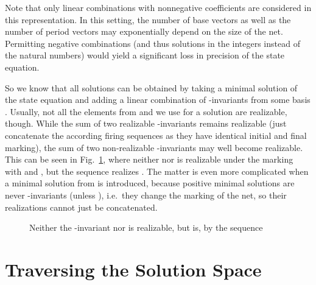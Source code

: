 \documentclass{LMCS}
\begin{document}
Note that only linear combinations with nonnegative coefficients are considered in this representation.
In this setting, the number of base vectors as well as the number of period vectors may exponentially depend on the
size of the net. Permitting negative combinations (and thus solutions in the integers instead of the natural numbers)
would yield a significant loss in precision of the state equation.


So we know that all solutions can be obtained by taking a minimal solution  of the state equation
and adding a linear combination of -invariants from some basis . Usually, not all the elements
from  and  we use for a solution are realizable, though. While the sum of two realizable -invariants
remains realizable (just concatenate the according firing sequences as they have identical initial and final marking), 
the sum of two non-realizable
-invariants may well become realizable. This can be seen in Fig.~\ref{f.tinv2}, where neither 
nor  is realizable under the marking  with  and , 
but the sequence  realizes . The matter is even more complicated when a minimal
solution from  is introduced, because positive minimal solutions are never -invariants (unless ), i.e.\ 
they change the marking of the net, so their realizations cannot just be concatenated.

\begin{figure}[tb]
\centering
{}
\caption{\label{f.tinv2}Neither the -invariant  nor  is realizable, but  is, 
	by the sequence }
\end{figure}

\section{Traversing the Solution Space}\label{sec3}
\end{document}
